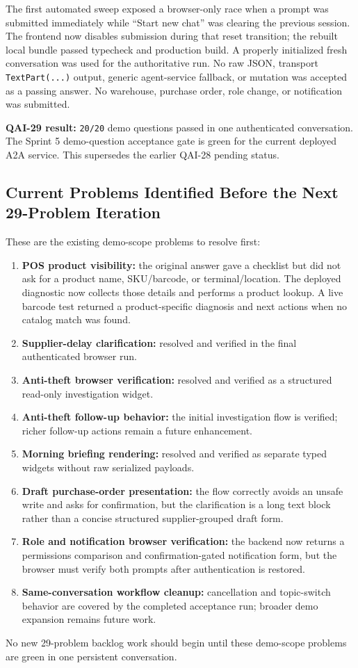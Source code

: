\documentclass[10pt]{article}
\begin{document}
The first automated sweep exposed a browser-only race when a prompt was submitted immediately while ``Start new chat'' was clearing the previous session. The frontend now disables submission during that reset transition; the rebuilt local bundle passed typecheck and production build. A properly initialized fresh conversation was used for the authoritative run. No raw JSON, transport \texttt{TextPart(...)} output, generic agent-service fallback, or mutation was accepted as a passing answer. No warehouse, purchase order, role change, or notification was submitted.

\textbf{QAI-29 result:} \texttt{20/20} demo questions passed in one authenticated conversation. The Sprint 5 demo-question acceptance gate is green for the current deployed A2A service. This supersedes the earlier QAI-28 pending status.

\subsection{Current Problems Identified Before the Next 29-Problem Iteration}
These are the existing demo-scope problems to resolve first:
\begin{enumerate}[leftmargin=18pt,itemsep=4pt]
\item \textbf{POS product visibility:} the original answer gave a checklist but did not ask for a product name, SKU/barcode, or terminal/location. The deployed diagnostic now collects those details and performs a product lookup. A live barcode test returned a product-specific diagnosis and next actions when no catalog match was found.
\item \textbf{Supplier-delay clarification:} resolved and verified in the final authenticated browser run.
\item \textbf{Anti-theft browser verification:} resolved and verified as a structured read-only investigation widget.
\item \textbf{Anti-theft follow-up behavior:} the initial investigation flow is verified; richer follow-up actions remain a future enhancement.
\item \textbf{Morning briefing rendering:} resolved and verified as separate typed widgets without raw serialized payloads.
\item \textbf{Draft purchase-order presentation:} the flow correctly avoids an unsafe write and asks for confirmation, but the clarification is a long text block rather than a concise structured supplier-grouped draft form.
\item \textbf{Role and notification browser verification:} the backend now returns a permissions comparison and confirmation-gated notification form, but the browser must verify both prompts after authentication is restored.
\item \textbf{Same-conversation workflow cleanup:} cancellation and topic-switch behavior are covered by the completed acceptance run; broader demo expansion remains future work.
\end{enumerate}
No new 29-problem backlog work should begin until these demo-scope problems are green in one persistent conversation.
\end{document}
